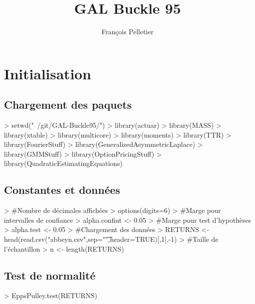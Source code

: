 \documentclass{report}
\begin{document}


\title{GAL Buckle 95}
\author{François Pelletier}
\maketitle
\tableofcontents

\chapter{Initialisation}

\section{Chargement des paquets}
\begin{Schunk}
\begin{Sinput}
> setwd("~/git/GAL-Buckle95/")
> library(actuar)
> library(MASS)
> library(xtable)
> library(multicore)
> library(moments)
> library(TTR)
> library(FourierStuff)
> library(GeneralizedAsymmetricLaplace)
> library(GMMStuff)
> library(OptionPricingStuff)
> library(QuadraticEstimatingEquations)
\end{Sinput}
\end{Schunk}

\section{Constantes et données}

\begin{Schunk}
\begin{Sinput}
> #Nombre de décimales affichées
> options(digits=6)
> #Marge pour intervalles de confiance
> alpha.confint <- 0.05 
> #Marge pour test d'hypothèses
> alpha.test <- 0.05
> #Chargement des données
> RETURNS <- head(read.csv("abbeyn.csv",sep="\t",header=TRUE)[,1],-1)
> #Taille de l'échantillon
> n <- length(RETURNS)
\end{Sinput}
\end{Schunk}

\section{Test de normalité}

\begin{Schunk}
\begin{Sinput}
> EppsPulley.test(RETURNS)
\end{Sinput}
\end{Schunk}
\end{document}
